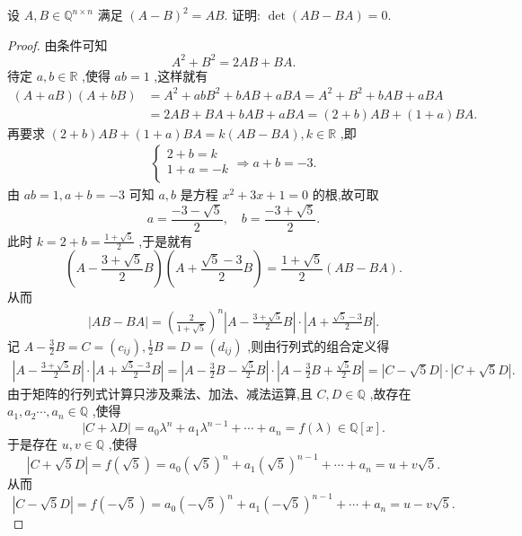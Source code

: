 \documentclass[../../main.tex]{subfiles}%
\begin{document}
\begin{example}
设 $A,B\in \mathbb{Q}^{n\times n}$ 满足 $(A-B)^2=AB$. 证明: $\det(AB-BA)=0$.
\end{example}
\begin{proof}

由条件可知
$$A^2+B^2=2AB+BA.$$
待定 $a,b\in \mathbb{R}$ ,使得 $ab=1$ ,这样就有
\begin{align*}
\left( A+aB \right) \left( A+bB \right) &=A^2+abB^2+bAB+aBA=A^2+B^2+bAB+aBA \\
&=2AB+BA+bAB+aBA=\left( 2+b \right) AB+\left( 1+a \right) BA.
\end{align*}
再要求 $\left( 2+b \right) AB+\left( 1+a \right) BA=k\left( AB-BA \right) ,k\in \mathbb{R}$ ,即
\begin{align*}
\left\{ \begin{array}{c}
2+b=k\\
1+a=-k\\
\end{array}\Longrightarrow \right. a+b=-3.
\end{align*}
由 $ab=1,a+b=-3$ 可知 $a,b$ 是方程 $x^2+3x+1=0$ 的根,故可取
$$a=\frac{-3-\sqrt{5}}{2},\quad b=\frac{-3+\sqrt{5}}{2}.$$
此时 $k=2+b=\frac{1+\sqrt{5}}{2}$ ,于是就有
$$\left( A-\frac{3+\sqrt{5}}{2}B \right) \left( A+\frac{\sqrt{5}-3}{2}B \right) =\frac{1+\sqrt{5}}{2}\left( AB-BA \right) .$$
从而
\begin{align}
\left| AB-BA \right|=\left( \frac{2}{1+\sqrt{5}} \right) ^n\left| A-\frac{3+\sqrt{5}}{2}B \right|\cdot \left| A+\frac{\sqrt{5}-3}{2}B \right|.
\label{eq::---47239yhr9wfsd1}
\end{align}
记 $A-\frac{3}{2}B=C=\left( c_{ij} \right) ,\frac{1}{2}B=D=\left( d_{ij} \right)$ ,则由行列式的组合定义得
\begin{align*}
\left| A-\frac{3+\sqrt{5}}{2}B \right|\cdot \left| A+\frac{\sqrt{5}-3}{2}B \right|=\left| A-\frac{3}{2}B-\frac{\sqrt{5}}{2}B \right|\cdot \left| A-\frac{3}{2}B+\frac{\sqrt{5}}{2}B \right| 
=\left| C-\sqrt{5}D \right|\cdot \left| C+\sqrt{5}D \right|.
\end{align*}
由于矩阵的行列式计算只涉及乘法、加法、减法运算,且 $C,D\in \mathbb{Q}$ ,故存在 
$a_1,a_2\cdots ,a_n\in \mathbb{Q}$ ,使得
$$\left| C+\lambda D \right|=a_0\lambda ^n+a_1\lambda ^{n-1}+\cdots +a_n=f\left( \lambda \right) \in \mathbb{Q} \left[ x \right] .$$
于是存在 $u,v\in \mathbb{Q}$ ,使得
$$\left| C+\sqrt{5}D \right|=f\left( \sqrt{5} \right) =a_0\left( \sqrt{5} \right) ^n+a_1\left( \sqrt{5} \right) ^{n-1}+\cdots +a_n=u+v\sqrt{5}.$$
从而
$$\left| C-\sqrt{5}D \right|=f\left( -\sqrt{5} \right) =a_0\left( -\sqrt{5} \right) ^n+a_1\left( -\sqrt{5} \right) ^{n-1}+\cdots +a_n=u-v\sqrt{5}.$$

\end{proof}
\end{document}
